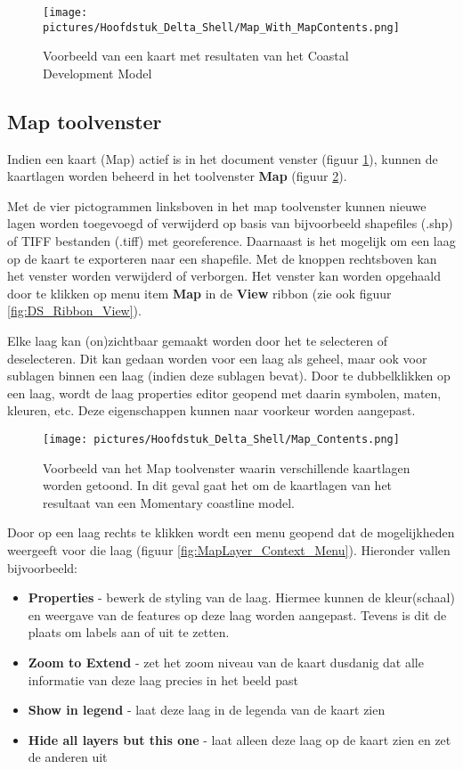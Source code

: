 \begin{figure}[H]
	\centering
		\texttt{[image: pictures/Hoofdstuk\_Delta\_Shell/Map\_With\_MapContents.png]}
		\caption{Voorbeeld van een kaart met resultaten van het Coastal Development Model}
	\label{fig:DS_Map}
\end{figure}

\subsection{Map toolvenster}
	\label{sec:DS_Map_Contents}
Indien een kaart (Map) actief is in het document venster (figuur \ref{fig:DS_Map}), kunnen de kaartlagen worden beheerd in het toolvenster \textbf{Map} (figuur \ref{fig:Map_Contents}).

Met de vier pictogrammen linksboven in het map toolvenster kunnen nieuwe lagen worden toegevoegd of verwijderd op basis van bijvoorbeeld shapefiles (.shp) of TIFF bestanden (.tiff) met georeference. Daarnaast is het mogelijk om een laag op de kaart te exporteren naar een shapefile. Met de knoppen rechtsboven kan het venster worden verwijderd of verborgen. Het venster kan worden opgehaald door te klikken op menu item \textbf{Map} in de \textbf{View} ribbon (zie ook figuur \ref{fig:DS_Ribbon_View}).

Elke laag kan (on)zichtbaar gemaakt worden door het te selecteren of deselecteren. Dit kan gedaan worden voor een laag als geheel, maar ook voor sublagen binnen een laag (indien deze sublagen bevat). Door te dubbelklikken op een laag, wordt de laag properties editor geopend met daarin symbolen, maten, kleuren, etc. Deze eigenschappen kunnen naar voorkeur worden aangepast.

\begin{figure}[h!]
	\centering
		\texttt{[image: pictures/Hoofdstuk\_Delta\_Shell/Map\_Contents.png]}
		\caption{Voorbeeld van het Map toolvenster waarin verschillende kaartlagen worden getoond. In dit geval gaat het om de kaartlagen van het resultaat van een Momentary coastline model.}
	\label{fig:Map_Contents}
\end{figure}

Door op een laag rechts te klikken wordt een menu geopend dat de mogelijkheden weergeeft voor die laag (figuur \ref{fig:MapLayer_Context_Menu}). Hieronder vallen bijvoorbeeld:
\begin{itemize}
\item \textbf{Properties} - bewerk de styling van de laag. Hiermee kunnen de kleur(schaal) en weergave van de features op deze laag worden aangepast. Tevens is dit de plaats om labels aan of uit te zetten.
\item \textbf{Zoom to Extend} - zet het zoom niveau van de kaart dusdanig dat alle informatie van deze laag precies in het beeld past
\item \textbf{Show in legend} - laat deze laag in de legenda van de kaart zien
\item \textbf{Hide all layers but this one} - laat alleen deze laag op de kaart zien en zet de anderen uit
\end{itemize}

